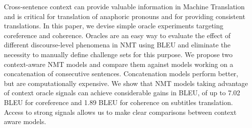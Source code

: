 Cross-sentence context can provide valuable information in Machine Translation and is critical for translation of anaphoric pronouns and for providing consistent translations. In this paper, we devise simple oracle experiments targeting coreference and coherence. Oracles are an easy way to evaluate the effect of different discourse-level phenomena in NMT using BLEU and eliminate the necessity to manually define challenge sets for this purpose. We propose two context-aware NMT models and compare them against models working on a concatenation of consecutive sentences. Concatenation models perform better, but are computationally expensive. We show that NMT models taking advantage of context oracle signals can achieve considerable gains in BLEU, of up to 7.02 BLEU for coreference and 1.89 BLEU for coherence on subtitles translation. Access to strong signals allows us to make clear comparisons between context aware models.
